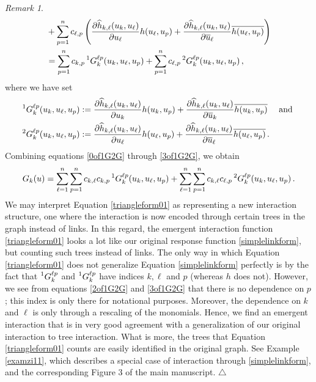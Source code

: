 \documentclass[12pt]{article}
\theoremstyle{plain}
\theoremstyle{definition}
\theoremstyle{remark}
\newtheorem{remk}[thr]{Remark}
\theoremstyle{remark}
\begin{document}
\begin{remk}
\begin{align}
 &+ \sum_{p=1}^nc_{\ell,p}\left(\frac{\partial \widehat{h}_{k,\ell}(u_{k}, u_{\ell})}{\partial u_{\ell}} h(u_{\ell}, u_p) + \frac{\partial \widehat{h}_{k,\ell}(u_{k}, u_{\ell})}{\partial \overline{u}_{\ell}} \overline{h(u_{\ell}, u_p)}\right) \\ \nonumber 
 &= \sum_{p=1}^nc_{k,p} \prescript{1}{}{G}_{k}^{\ell p}(u_k, u_{\ell}, u_p)+  \sum_{p=1}^nc_{\ell,p}\prescript{2}{}{G}_{k}^{\ell p}(u_k, u_{\ell}, u_p)\, ,
\end{align}
where we have set 
\begin{align}\label{2of1G2G}
\prescript{1}{}{G}_{k}^{\ell p}(u_k, u_{\ell}, u_p) &:= \frac{\partial \widehat{h}_{k,\ell}(u_{k}, u_{\ell})}{\partial u_{k}} h(u_{k}, u_p) + \frac{\partial \widehat{h}_{k,\ell}(u_{k}, u_{\ell})}{\partial \overline{u}_{k}} \overline{h(u_{k}, u_p)} \quad \text{ and } \\ \label{3of1G2G}
\prescript{2}{}{G}_{k}^{\ell p}(u_k, u_{\ell}, u_p) &:= \frac{\partial \widehat{h}_{k,\ell}(u_{k}, u_{\ell})}{\partial u_{\ell}} h(u_{\ell}, u_p) + \frac{\partial \widehat{h}_{k,\ell}(u_{k}, u_{\ell})}{\partial \overline{u}_{\ell}} \overline{h(u_{\ell}, u_p)}\, .
\end{align}
Combining equations \eqref{0of1G2G} through \eqref{3of1G2G}, we obtain
\begin{align}\label{triangleform01}
G_k(u) = \sum_{\ell=1}^n \sum_{p=1}^n c_{k,\ell}  c_{k,p} \prescript{1}{}{G}_{k}^{\ell p}(u_k, u_{\ell}, u_p) + \sum_{\ell=1}^n   \sum_{p=1}^n c_{k,\ell} c_{\ell,p}\prescript{2}{}{G}_{k}^{\ell p}(u_k, u_{\ell}, u_p) \, .
\end{align}
We may interpret Equation \eqref{triangleform01} as representing a new interaction structure, one where the interaction is now encoded through certain trees in the graph instead of links. In this regard, the emergent interaction function \eqref{triangleform01} looks a lot like our original response function \eqref{simplelinkform}, but counting such trees instead of links. The only way in which Equation \eqref{triangleform01}  does not generalize  Equation \eqref{simplelinkform} perfectly is by the fact that $\prescript{1}{}{G}_{k}^{\ell p}$ and $\prescript{1}{}{G}_{k}^{\ell p}$ have indices $k,\ell$ and $p$ (whereas ${h}$ does not). However, we see from equations \eqref{2of1G2G}  and \eqref{3of1G2G} that there is no dependence on $p$; this index is only there for notational purposes. Moreover, the dependence on $k$ and $\ell$ is only through a rescaling of the monomials. Hence, we find an emergent interaction that is in very good agreement with a generalization of our original interaction to tree interaction. What is more, the trees that Equation \eqref{triangleform01} counts are easily identified in the original graph. See Example \ref{examzi11}, which describes a special case of interaction through \eqref{simplelinkform}, and the corresponding Figure 3 of the main manuscript. \hfill $\triangle$
\end{remk}
\end{document}
